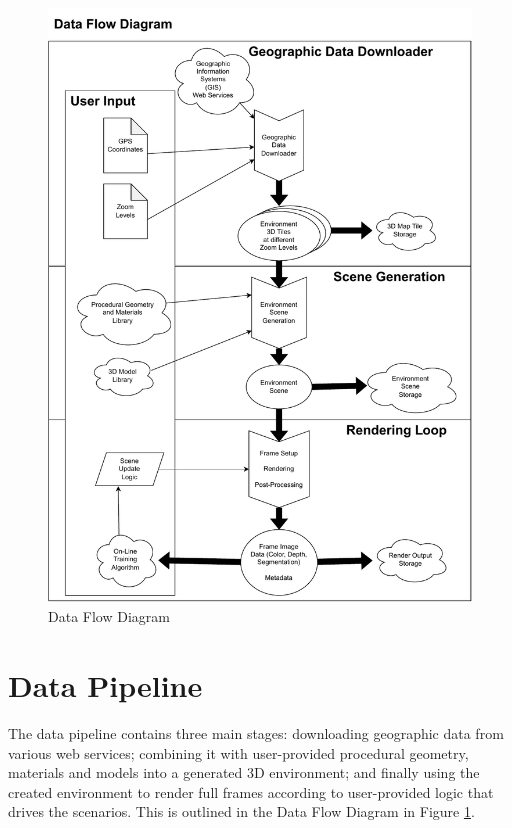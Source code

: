 \begin{figure}[ht!]
    \centering
    \includegraphics[width=14cm]{src/img/fig/fig-1-overview-v2.drawio-1.pdf}
    \caption{Data Flow Diagram}

    \label{fig:design-overview}
\end{figure}

\section{Data Pipeline}
\label{sec:data-pipeline}

The data pipeline contains three main stages: downloading geographic data from various web services; combining it with user-provided procedural geometry, materials and models into a generated 3D environment; and finally using the created environment to render full frames according to user-provided logic that drives the scenarios. This is outlined in the Data Flow Diagram in Figure \ref{fig:design-overview}.



